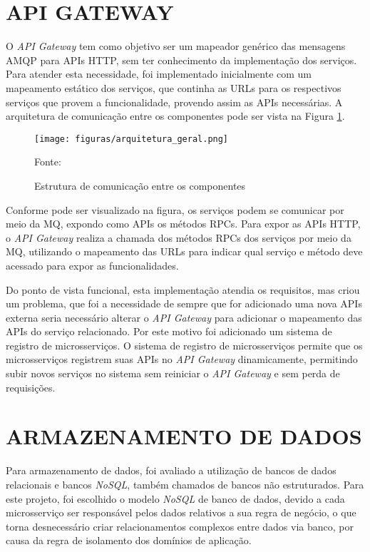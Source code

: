 \section{API GATEWAY}

O \emph{API Gateway} tem como objetivo ser um mapeador genérico das mensagens
\ac{AMQP} para \acp{API} \ac{HTTP}, sem ter conhecimento da implementação dos
serviços. Para atender esta necessidade, foi implementado inicialmente com um
mapeamento estático dos serviços, que continha as \acp{URL} para os respectivos
serviços que provem a funcionalidade, provendo assim as \acp{API} necessárias.
A arquitetura de comunicação entre os componentes pode ser vista na Figura
\ref{fig:arch-geral}.

\begin{figure}[H]
	\centering
	\caption{Estrutura de comunicação entre os componentes}
	\texttt{[image: figuras/arquitetura\_geral.png]}

    \label{fig:arch-geral}
	\footnotesize Fonte: \fonteOAutor
\end{figure}

Conforme pode ser visualizado na figura, os serviços podem se comunicar por
meio da \ac{MQ}, expondo como \acp{API} os métodos \acp{RPC}. Para expor
as \acp{API} \ac{HTTP}, o \emph{API Gateway} realiza a chamada dos métodos
\acp{RPC} dos serviços por meio da \ac{MQ}, utilizando o mapeamento das
\acp{URL} para indicar qual serviço e método deve acessado para expor as
funcionalidades.

Do ponto de vista funcional, esta implementação atendia os requisitos, mas
criou um problema, que foi a necessidade de sempre que for adicionado uma
nova \acp{API} externa seria necessário alterar o \emph{API Gateway} para
adicionar o mapeamento das \acp{API} do serviço relacionado. Por este motivo
foi adicionado um sistema de registro de microsserviços. O sistema de
registro de microsserviços permite que os microsserviços registrem suas
\acp{API} no \emph{API Gateway} dinamicamente, permitindo subir novos
serviços no sistema sem reiniciar o \emph{API Gateway} e sem perda de
requisições.

\section{ARMAZENAMENTO DE DADOS}

Para armazenamento de dados, foi avaliado a utilização de bancos de dados
relacionais e bancos \emph{NoSQL}, também chamados de bancos não estruturados.
Para este projeto, foi escolhido o modelo \emph{NoSQL} de banco de dados,
devido a cada microsserviço ser responsável pelos dados relativos a sua regra
de negócio, o que torna desnecessário criar relacionamentos complexos entre
dados via banco, por causa da regra de isolamento dos domínios de aplicação.

